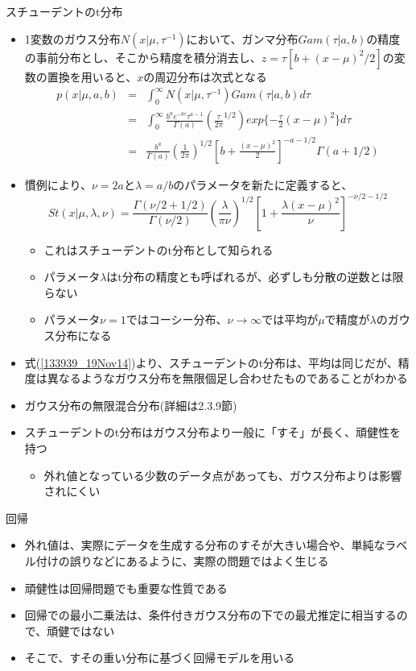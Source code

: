 \begin{frame}{スチューデントのt分布}
 \begin{itemize}
	\item 1変数のガウス分布$N(x|\mu, \tau^{-1})$において、ガンマ分布$Gam(\tau|a,b)$の精度の事前分布とし、そこから精度を積分消去し、$z=\tau[b+(x-\mu)^2/2]$の変数の置換を用いると、$x$の周辺分布は次式となる
				\begin{eqnarray}
				 p(x|\mu,a,b) &=& \int_0^\infty N(x|\mu,\tau^{-1})Gam(\tau|a,b)d\tau\label{133939_19Nov14} \\
				 &= & \int_{0}^{\infty}\frac{b^ae^{-b\tau}\tau^{a-1}}{\Gamma(a)}(\frac{\tau}{2\pi}^{1/2})exp\{-\frac{\tau}{2}(x-\mu)^2\}d\tau \nonumber\\
				 &= & \frac{b^a}{\Gamma(a)}(\frac{1}{2\pi})^{1/2}[b+\frac{(x-\mu)^2}{2}]^{-a-1/2}\Gamma(a+1/2)
				\end{eqnarray}
	\item 慣例により、$\nu=2a$と$\lambda=a/b$のパラメータを新たに定義すると、
\begin{equation}
 St(x|\mu,\lambda,\nu) = \frac{\Gamma(\nu/2+1/2)}{\Gamma(\nu/2)}(\frac{\lambda}{\pi\nu})^{1/2}[1+\frac{\lambda(x-\mu)^2}{\nu}]^{-\nu/2-1/2}
\end{equation}
				\begin{itemize}
				 \item これはスチューデントのt分布として知られる
				 \item パラメータ$\lambda$はt分布の精度とも呼ばれるが、必ずしも分散の逆数とは限らない
				 \item パラメータ$\nu=1$ではコーシー分布、$\nu\rightarrow\infty$では平均が$\mu$で精度が$\lambda$のガウス分布になる
				\end{itemize}
	\item 式(\ref{133939_19Nov14})より、スチューデントのt分布は、平均は同じだが、精度は異なるようなガウス分布を無限個足し合わせたものであることがわかる
	\item ガウス分布の無限混合分布(詳細は2.3.9節)
	\item スチューデントのt分布はガウス分布より一般に「すそ」が長く、頑健性を持つ
				\begin{itemize}
				 \item 外れ値となっている少数のデータ点があっても、ガウス分布よりは影響されにくい
				\end{itemize}
 \end{itemize}
\end{frame}

\begin{frame}{回帰}
 \begin{itemize}
	\item 外れ値は、実際にデータを生成する分布のすそが大きい場合や、単純なラベル付けの誤りなどにあるように、実際の問題ではよく生じる
	\item 頑健性は回帰問題でも重要な性質である
				\item 回帰での最小二乗法は、条件付きガウス分布の下での最尤推定に相当するので、頑健ではない
	\item そこで、すその重い分布に基づく回帰モデルを用いる
 \end{itemize}
\end{frame}

